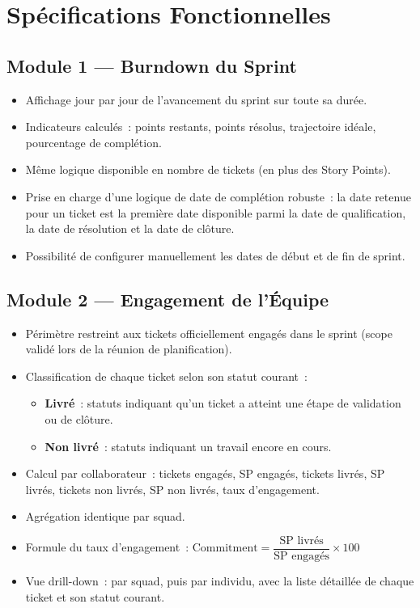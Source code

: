 \documentclass[12pt, a4paper]{article}
\begin{document}
\section{Spécifications Fonctionnelles}

\subsection{Module 1 — Burndown du Sprint}

\begin{itemize}[leftmargin=1.5em, itemsep=3pt]
  \item Affichage jour par jour de l'avancement du sprint sur toute sa durée.
  \item Indicateurs calculés~: points restants, points résolus, trajectoire idéale,
        pourcentage de complétion.
  \item Même logique disponible en nombre de tickets (en plus des Story Points).
  \item Prise en charge d'une logique de date de complétion robuste~: la date
        retenue pour un ticket est la première date disponible parmi la date de
        qualification, la date de résolution et la date de clôture.
  \item Possibilité de configurer manuellement les dates de début et de fin de sprint.
\end{itemize}

\vspace{0.2cm}

\subsection{Module 2 — Engagement de l'Équipe}

\begin{itemize}[leftmargin=1.5em, itemsep=3pt]
  \item Périmètre restreint aux tickets officiellement engagés dans le sprint
        (scope validé lors de la réunion de planification).
  \item Classification de chaque ticket selon son statut courant~:
  \begin{itemize}
    \item \textbf{Livré}~: statuts indiquant qu'un ticket a atteint une étape
          de validation ou de clôture.
    \item \textbf{Non livré}~: statuts indiquant un travail encore en cours.
  \end{itemize}
  \item Calcul par collaborateur~: tickets engagés, SP engagés, tickets livrés,
        SP livrés, tickets non livrés, SP non livrés, taux d'engagement.
  \item Agrégation identique par squad.
  \item Formule du taux d'engagement~:
        $\text{Commitment} = \dfrac{\text{SP livrés}}{\text{SP engagés}} \times 100$
  \item Vue drill-down~: par squad, puis par individu, avec la liste détaillée de
        chaque ticket et son statut courant.
\end{itemize}
\end{document}
